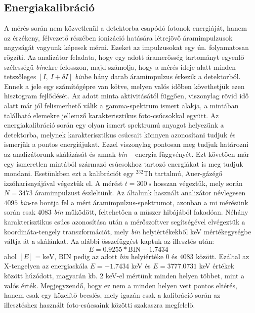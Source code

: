\begin{multicols}{2}
\section{Energiakalibráció}
A mérés során nem közvetlenül a detektorba csapódó fotonok energiáját, hanem az érzékeny, félvezető részében ionizáció hatására létrejövő áramimpulzusok nagyságát vagyunk képesek mérni. Ezeket az impulzusokat egy ún.  folyamatosan rögzíti. Az analizátor feladata, hogy egy adott áramerősség tartományt egyenlő szélességű \emph{bin}ekre felosszon, majd számolja, hogy a mérés ideje alatt minden tetszőleges $\left[ I,\ I + \delta I \right]$ \emph{bin}be hány darab áramimpulzus érkezik a detektorból. Ennek a jele egy számítógépre van kötve, melyen valós időben követhetjük ezen hisztogram fejlődését. Az adott minta aktivitásától függően, viszonylag rövid idő alatt már jól felismerhető válik a gamma-spektrum ismert alakja, a mintában található elemekre jellemző karakterisztikus foto-csúcsokkal együtt. \newline
Az energiakalibráció során egy olyan ismert spektrumú anyagot helyezünk a detektorba, melynek karakterisztikus csúcsait könnyen azonosítani tudjuk és ismerjük a pontos energiájukat. Ezzel viszonylag pontosan meg tudjuk határozni az analizátorunk skálázását és annak \emph{bin} -- energia függvényét. Ezt követően már egy ismeretlen mintából származó csúcsokhoz tartozó energiákat is meg tudjuk mondani. \newline
Esetünkben ezt a kalibrációt egy $^{232}$Th tartalmú, Auer-gázégő izzóharisnyájával végeztük el. A mérést $t = 300\ \text{s}$ hosszan végeztük, mely során $N = 3473$ áramimpulzust észleltünk. Az általunk használt analizátor névlegesen $4095$ \emph{bin}-re bontja fel a mért áramimpulzus-spektrumot, azonban a mi mérésünk során csak $4083$ \emph{bin} működött, feltehetően a műszer hibájából fakadóan. Néhány karakterisztikus csúcs azonosítása után a mérőszoftver segítségével elvégeztük a koordináta-tengely transzformációt, mely \emph{bin} helyiértékekből keV mértékegységbe váltja át a skálánkat. Az alábbi összefüggést kaptuk az illesztés után:
\begin{equation}
    E
    =
    0.9255 * \text{BIN} - 1.7434
\end{equation}
ahol $\left[ E \right] = \text{keV}$, BIN pedig az adott \emph{bin} helyiértéke $0$ és $4083$ között. Ezáltal az X-tengelyen az energiaskála $E = -1.7434$ keV és $E = 3777.0731$ keV értékek között húzódott, magyarán kb. $2$ keV-el mértünk minden helyen többet, mint a valós érték. Megjegyzendő, hogy ez nem a minden helyen vett pontos eltérés, hanem csak egy közelítő becslés, mely igazán csak a kalibráció során az illesztéshez használt foto-csúcsaink közötti szakaszra megfelelő.


\end{multicols}
